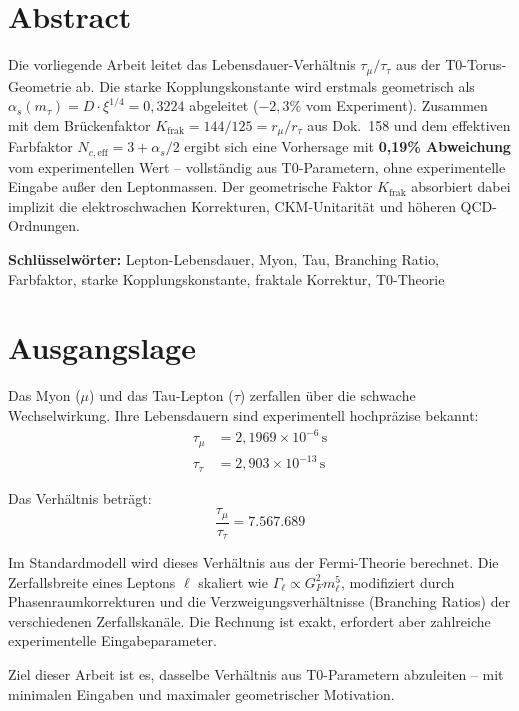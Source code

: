 	\section*{Abstract}
	Die vorliegende Arbeit leitet das Lebensdauer-Verhältnis $\tau_\mu/\tau_\tau$ aus der T0-Torus-Geometrie ab. Die starke Kopplungskonstante wird erstmals geometrisch als $\alpha_s(m_\tau) = D \cdot \xi^{1/4} = 0{,}3224$ abgeleitet ($-2{,}3\%$ vom Experiment). Zusammen mit dem Brückenfaktor $K_\text{frak} = 144/125 = r_\mu/r_\tau$ aus Dok.~158 und dem effektiven Farbfaktor $N_{c,\text{eff}} = 3 + \alpha_s/2$ ergibt sich eine Vorhersage mit \textbf{0,19\% Abweichung} vom experimentellen Wert -- vollständig aus T0-Parametern, ohne experimentelle Eingabe außer den Leptonmassen. Der geometrische Faktor $K_\text{frak}$ absorbiert dabei implizit die elektroschwachen Korrekturen, CKM-Unitarität und höheren QCD-Ordnungen.
	
	\textbf{Schlüsselwörter:} Lepton-Lebensdauer, Myon, Tau, Branching Ratio, Farbfaktor, starke Kopplungskonstante, fraktale Korrektur, T0-Theorie
	
	
	\section{Ausgangslage}
	
	Das Myon ($\mu$) und das Tau-Lepton ($\tau$) zerfallen über die schwache Wechselwirkung. Ihre Lebensdauern sind experimentell hochpräzise bekannt:
	\begin{align}
		\tau_\mu &= 2{,}1969 \times 10^{-6} \, \text{s} \\
		\tau_\tau &= 2{,}903 \times 10^{-13} \, \text{s}
	\end{align}
	
	Das Verhältnis beträgt:
	\begin{equation}
		\frac{\tau_\mu}{\tau_\tau} = 7{.}567{.}689
	\end{equation}
	
	Im Standardmodell wird dieses Verhältnis aus der Fermi-Theorie berechnet. Die Zerfallsbreite eines Leptons $\ell$ skaliert wie $\Gamma_\ell \propto G_F^2 m_\ell^5$, modifiziert durch Phasenraumkorrekturen und die Verzweigungsverhältnisse (Branching Ratios) der verschiedenen Zerfallskanäle. Die Rechnung ist exakt, erfordert aber zahlreiche experimentelle Eingabeparameter.
	
	Ziel dieser Arbeit ist es, dasselbe Verhältnis aus T0-Parametern abzuleiten -- mit minimalen Eingaben und maximaler geometrischer Motivation.
	
